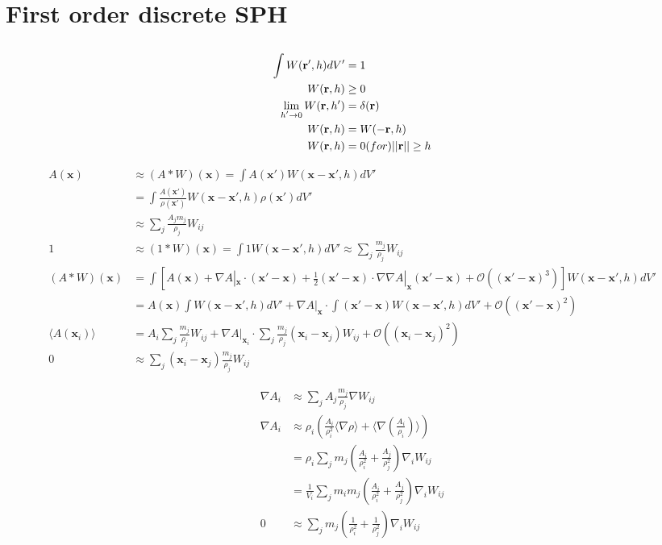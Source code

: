 \documentclass{article}
\newcommand{\xx}{\mathbf{x}}
\newcommand{\rr}{\mathbf{r}}
\begin{document}
\section{First order discrete SPH}
\subsection{ \cite{koschier:2020:sphreview} }

\begin{align*}
  \int W(\rr',h) dV' &= 1 \\
  W(\rr,h) &\ge 0 \\
  \lim_{\substack{h' \rightarrow 0}} W(\rr,h') &= \delta(\rr) \\
  W(\rr,h) &= W(-\rr,h) \\
  W(\rr,h) &= 0  \text( for ) || \rr || \ge h
\end{align*}

\begin{align*}
  A(\xx) &\approx (A * W) (\xx) = \int A(\xx') W(\xx-\xx',h) dV' \\
       &= \int \frac{A(\xx')}{\rho(\xx')} W(\xx-\xx',h) \rho(\xx') dV' \\
       &\approx \sum_j \frac{A_j m_j}{\rho_j} W_{ij}  \\ 
  1 &\approx (1 * W) (\xx) = \int 1 W(\xx-\xx',h) dV' \approx \sum_j \frac{m_j}{\rho_j} W_{ij} \\
  (A*W)(\xx) &= \int \left[ A(\xx) + \nabla A|_\xx \cdot (\xx' - \xx) + \frac{1}{2} (\xx' - \xx) \cdot \nabla \nabla A|_\xx (\xx' - \xx) +\mathcal{O} ((\xx' - \xx)^3) \right] W(\xx - \xx',h) dV' \\
         &= A(\xx) \int W(\xx - \xx',h) dV'  + \nabla A|_\xx \cdot \int (\xx' - \xx) W(\xx - \xx',h) dV' + \mathcal{O} ((\xx' - \xx)^2) \\
  \langle A(\xx_i) \rangle &= A_i \sum_j \frac{m_j}{\rho_j} W_{ij} + \nabla A |_{\xx_i} \cdot \sum_j \frac{m_j}{\rho_j} (\xx_i - \xx_j) W_{ij} + \mathcal{O}((\xx_i-\xx_j)^2) \\
  0 &\approx \sum_j (\xx_i - \xx_j) \frac{m_j}{\rho_j} W_{ij} 
\end{align*}

\begin{align*}
  \nabla A_i &\approx \sum_j A_j \frac{m_j}{\rho_j} \nabla W_{ij} \\
  \nabla A_i &\approx \rho_i \left( \frac{A_i}{\rho_i^2} \langle \nabla \rho \rangle + \langle \nabla \left( \frac{A_i}{\rho_i} \right) \rangle \right) \\
             &= \rho_i \sum_j m_j \left( \frac{A_i}{\rho_i^2} + \frac{A_j}{\rho_j^2} \right) \nabla_i W_{ij} \\
             &= \frac{1}{V_i} \sum_j m_i m_j \left( \frac{A_i}{\rho_i^2} + \frac{A_j}{\rho_j^2} \right) \nabla_i W_{ij} \\
          0   &\approx \sum_j m_j \left( \frac{1}{\rho_i^2} + \frac{1}{\rho_j^2} \right) \nabla_i W_{ij} 
\end{align*}
\end{document}
